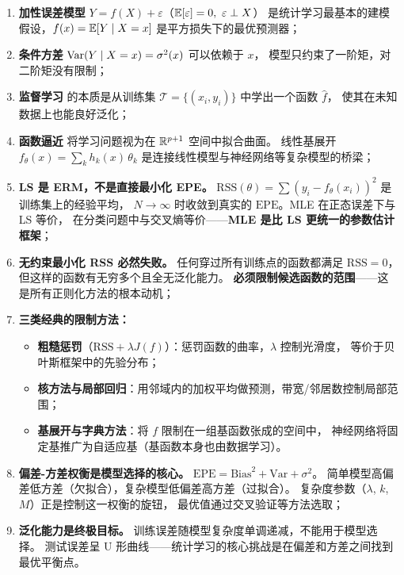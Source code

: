\begin{enumerate}[label=(\arabic*)]
    \item \textbf{加性误差模型} $Y = f(X) + \varepsilon$（$\mathbb{E}[\varepsilon]=0,\ \varepsilon \perp X$）
    是统计学习最基本的建模假设，$f(x) = \mathbb{E}[Y \mid X = x]$ 是平方损失下的最优预测器；
    
    \item \textbf{条件方差} $\mathrm{Var}(Y \mid X = x) = \sigma^2(x)$ 可以依赖于 $x$，
    模型只约束了一阶矩，对二阶矩没有限制；
    
    \item \textbf{监督学习} 的本质是从训练集 $\mathcal{T} = \{(x_i, y_i)\}$ 中学出一个函数 $\hat{f}$，
    使其在未知数据上也能良好泛化；
    
    \item \textbf{函数逼近} 将学习问题视为在 $\mathbb{R}^{p+1}$ 空间中拟合曲面。
    线性基展开 $f_\theta(x) = \sum_k h_k(x)\,\theta_k$ 是连接线性模型与神经网络等复杂模型的桥梁；
    
    \item \textbf{LS 是 ERM，不是直接最小化 EPE。} 
    $\mathrm{RSS}(\theta) = \sum (y_i - f_\theta(x_i))^2$ 是训练集上的经验平均，
    $N \to \infty$ 时收敛到真实的 $\mathrm{EPE}$。MLE 在正态误差下与 LS 等价，
    在分类问题中与交叉熵等价——\textbf{MLE 是比 LS 更统一的参数估计框架}；
    
    \item \textbf{无约束最小化 RSS 必然失败。}
    任何穿过所有训练点的函数都满足 $\mathrm{RSS}=0$，但这样的函数有无穷多个且全无泛化能力。
    \textbf{必须限制候选函数的范围}——这是所有正则化方法的根本动机；
    
    \item \textbf{三类经典的限制方法：}
    \begin{itemize}
        \item \textbf{粗糙惩罚}（$\mathrm{RSS} + \lambda J(f)$）：惩罚函数的曲率，$\lambda$ 控制光滑度，
        等价于贝叶斯框架中的先验分布；
        \item \textbf{核方法与局部回归}：用邻域内的加权平均做预测，带宽/邻居数控制局部范围；
        \item \textbf{基展开与字典方法}：将 $f$ 限制在一组基函数张成的空间中，
        神经网络将固定基推广为自适应基（基函数本身也由数据学习）。
    \end{itemize}
    
    \item \textbf{偏差-方差权衡是模型选择的核心。}
    $\mathrm{EPE} = \mathrm{Bias}^2 + \mathrm{Var} + \sigma^2$。
    简单模型高偏差低方差（欠拟合），复杂模型低偏差高方差（过拟合）。
    复杂度参数（$\lambda$, $k$, $M$）正是控制这一权衡的旋钮，
    最优值通过交叉验证等方法选取；
    
    \item \textbf{泛化能力是终极目标。}
    训练误差随模型复杂度单调递减，不能用于模型选择。
    测试误差呈 U 形曲线——统计学习的核心挑战是在偏差和方差之间找到最优平衡点。
\end{enumerate}

